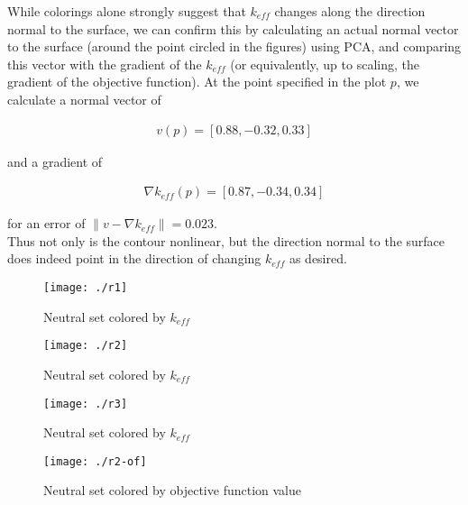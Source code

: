 \documentclass[11pt]{article}
\begin{document}
While colorings alone strongly suggest that $k_{eff}$ changes along the
direction normal to the surface, we can confirm this by calculating an
actual normal vector to the surface (around the point circled in the
figures) using PCA, and comparing this vector with the gradient of the
$k_{eff}$ (or equivalently, up to scaling, the gradient of the
objective function). At the point specified in the plot $p$, we calculate
a normal vector of

\begin{align*}
  v(p) = [0.88, -0.32, 0.33]
\end{align*}

and a gradient of 

\begin{align*}
  \nabla k_{eff} (p) = [0.87, -0.34, 0.34]
\end{align*}

for an error of $\| v - \nabla k_{eff} \| = 0.023$. \\

Thus not only is the contour nonlinear, but the direction normal to
the surface does indeed point in the direction of changing $k_{eff}$
as desired.

\begin{figure}[htbp]
  \centering
  \texttt{[image: ./r1]}
  \caption{Neutral set colored by $k_{eff}$ \label{fig:r1}}
\end{figure}

\begin{figure}[htbp]
  \centering
  \texttt{[image: ./r2]}
  \caption{Neutral set colored by $k_{eff}$ \label{fig:r2}}
\end{figure}

\begin{figure}[htbp]
  \centering
  \texttt{[image: ./r3]}
  \caption{Neutral set colored by $k_{eff}$ \label{fig:r3}}
\end{figure}

\begin{figure}[htbp]
  \centering
  \texttt{[image: ./r2-of]}
  \caption{Neutral set colored by objective function value \label{fig:r2-of}}
\end{figure}

% 
% 
\end{document}
